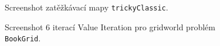 \begin{figure}[!htbp]
\begin{center}
  \caption{Screenshot zatěžkávací mapy \texttt{trickyClassic}.}
  \label{img:tricky}
\end{center}
\end{figure}

\label{pril:experobr}
\begin{figure}[!htbp]
\begin{center}
  \caption{Screenshot 6 iterací Value Iteration pro gridworld problém \texttt{BookGrid}.}
  \label{img:valiter6}
\end{center}
\end{figure}


